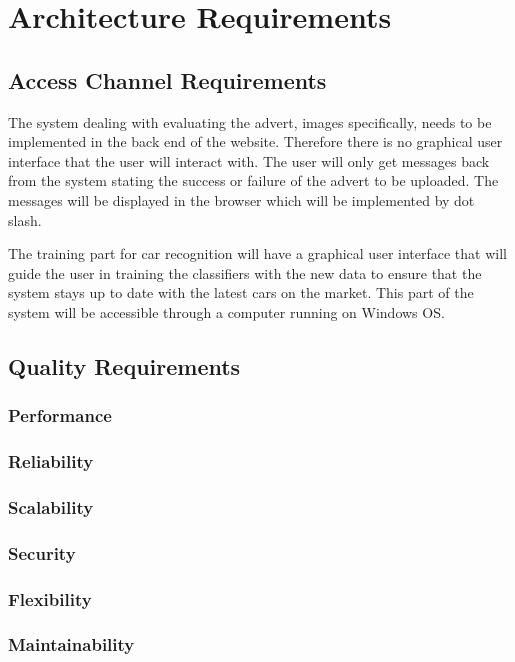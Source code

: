 \section{Architecture Requirements}
\subsection{Access Channel Requirements}
The system dealing with evaluating the advert, images specifically, needs to be implemented in the back end of the website. Therefore there is no graphical user interface that the user will interact with. The user will only get messages back from the system stating the success or failure of the advert to be uploaded. The messages will be displayed in the browser which will be implemented by dot slash. 

The training part for car recognition will have a graphical user interface that will guide the user in training the classifiers with the new data to ensure that the system stays up to date with the latest cars on the market. This part of the system will be accessible through a computer running on Windows OS.

\subsection{Quality Requirements}

\subsubsection{Performance}

\subsubsection{Reliability}

\subsubsection{Scalability}

\subsubsection{Security}

\subsubsection{Flexibility}

\subsubsection{Maintainability}

